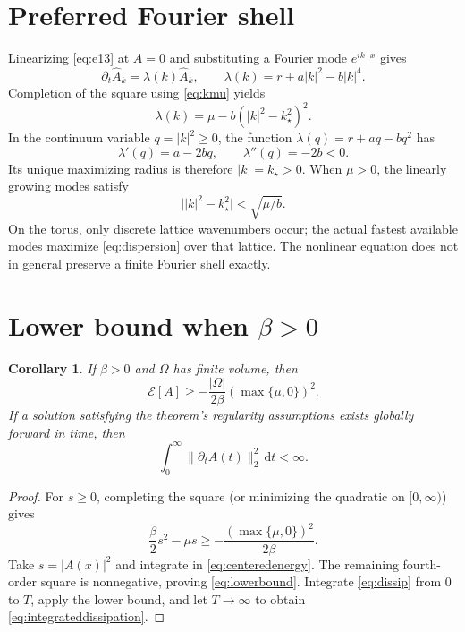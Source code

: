 \documentclass[11pt]{article}
\newtheorem{corollary}{Corollary}
\newcommand{\Om}{\Omega}
\newcommand{\E}{\mathcal E}
\newcommand{\dd}{\mathrm d}
\begin{document}
\section{Preferred Fourier shell}
Linearizing \eqref{eq:e13} at $A=0$ and substituting a Fourier
mode $e^{ik\cdot x}$ gives
\[
 \partial_t\widehat A_k=\lambda(k)\widehat A_k,
 \qquad
 \lambda(k)=r+a|k|^2-b|k|^4.
\]
Completion of the square using \eqref{eq:kmu} yields
\begin{equation}\label{eq:dispersion}
 \lambda(k)=\mu-b(|k|^2-k_\star^2)^2.
\end{equation}
In the continuum variable $q=|k|^2\geq0$, the function
$\lambda(q)=r+aq-bq^2$ has
\[
 \lambda'(q)=a-2bq,\qquad\lambda''(q)=-2b<0.
\]
Its unique maximizing radius is therefore $|k|=k_\star>0$.
When $\mu>0$, the linearly growing modes satisfy
\begin{equation}\label{eq:unstableband}
 \bigl||k|^2-k_\star^2\bigr|<\sqrt{\mu/b}.
\end{equation}
On the torus, only discrete lattice wavenumbers occur; the actual
fastest available modes maximize \eqref{eq:dispersion} over that lattice.
The nonlinear equation does not in general preserve a finite Fourier
shell exactly.

\section{Lower bound when $\beta>0$}
\begin{corollary}\label{cor:bound}
If $\beta>0$ and $\Om$ has finite volume, then
\begin{equation}\label{eq:lowerbound}
 \E[A]\geq-\frac{|\Om|}{2\beta}(\max\{\mu,0\})^2.
\end{equation}
If a solution satisfying the theorem's regularity assumptions exists
globally forward in time, then
\begin{equation}\label{eq:integrateddissipation}
 \int_0^\infty\|\partial_t A(t)\|_2^2\,\dd t<\infty.
\end{equation}
\end{corollary}
\begin{proof}
For $s\geq0$, completing the square (or minimizing the quadratic on
$[0,\infty)$) gives
\[
 \frac\beta2 s^2-\mu s
 \geq-\frac{(\max\{\mu,0\})^2}{2\beta}.
\]
Take $s=|A(x)|^2$ and integrate in \eqref{eq:centeredenergy}.
The remaining fourth-order square is nonnegative, proving
\eqref{eq:lowerbound}.  Integrate \eqref{eq:dissip} from $0$ to $T$,
apply the lower bound, and let $T\to\infty$ to obtain
\eqref{eq:integrateddissipation}.
\end{proof}
\end{document}
